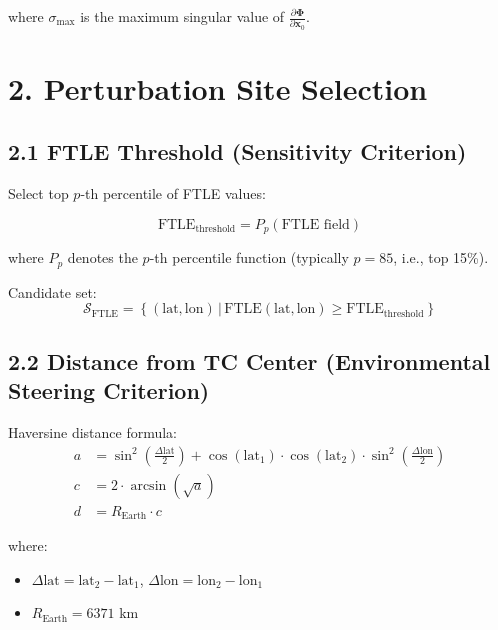 \documentclass{article}
\begin{document}
where $\sigma_{\max}$ is the maximum singular value of $\frac{\partial \bm{\Phi}}{\partial \bm{x}_0}$.


\section*{2. Perturbation Site Selection}

\subsection*{2.1 FTLE Threshold (Sensitivity Criterion)}

Select top $p$-th percentile of FTLE values:

\begin{equation}
\text{FTLE}_{\text{threshold}} = P_p(\text{FTLE field})
\end{equation}

where $P_p$ denotes the $p$-th percentile function (typically $p = 85$, i.e., top 15\%).

Candidate set:
\begin{equation}
\mathcal{S}_{\text{FTLE}} = \left\{ (\text{lat}, \text{lon}) \,|\, \text{FTLE}(\text{lat}, \text{lon}) \geq \text{FTLE}_{\text{threshold}} \right\}
\end{equation}

\subsection*{2.2 Distance from TC Center (Environmental Steering Criterion)}

Haversine distance formula:
\begin{align}
a &= \sin^2\left(\frac{\Delta \text{lat}}{2}\right) + \cos(\text{lat}_1) \cdot \cos(\text{lat}_2) \cdot \sin^2\left(\frac{\Delta \text{lon}}{2}\right) \\
c &= 2 \cdot \arcsin(\sqrt{a}) \\
d &= R_{\text{Earth}} \cdot c
\end{align}

where:
\begin{itemize}
    \item $\Delta \text{lat} = \text{lat}_2 - \text{lat}_1$, $\Delta \text{lon} = \text{lon}_2 - \text{lon}_1$
    \item $R_{\text{Earth}} = 6371$ km
\end{itemize}
\end{document}
